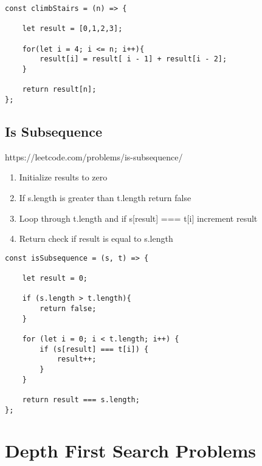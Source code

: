 \documentclass[10pt]{article}
\begin{document}
\begin{lstlisting}[title=Solution climbStairs, captionpos=t]
const climbStairs = (n) => {

    let result = [0,1,2,3];
    
    for(let i = 4; i <= n; i++){
        result[i] = result[ i - 1] + result[i - 2];
    }
    
    return result[n];
};
\end{lstlisting}

\medskip %








\pagebreak %
\medskip   
\subsection{Is Subsequence}
https://leetcode.com/problems/is-subsequence/

\begin{enumerate}
	\item Initialize results to zero
	\item If s.length is greater than t.length return false
	\item Loop through t.length and if s[result] === t[i] increment result
	\item Return check if result is equal to s.length
\end{enumerate}

\begin{lstlisting}[title=Solution isSubsequence, captionpos=t]
const isSubsequence = (s, t) => {
    
    let result = 0;

    if (s.length > t.length){
        return false;
    } 

    for (let i = 0; i < t.length; i++) {
        if (s[result] === t[i]) {
            result++;
        }
    }

    return result === s.length;
};
\end{lstlisting}

\medskip %














\pagebreak
\section{Depth First Search Problems}
\end{document}

